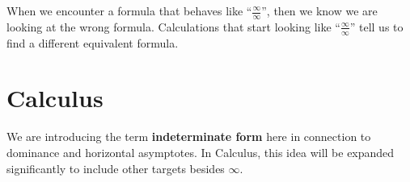 \documentclass{ximera}
\begin{document}
When we encounter a formula that behaves like ``$\frac{\infty}{\infty}$'', then we know we are looking at the wrong formula.   Calculations that start looking like ``$\frac{\infty}{\infty}$'' tell us to find a different equivalent formula. 



























\section*{Calculus}


We are introducing the term \textbf{indeterminate form} here in connection to dominance and horizontal asymptotes.  In Calculus, this idea will be expanded significantly to include other targets besides $\infty$.
\end{document}
